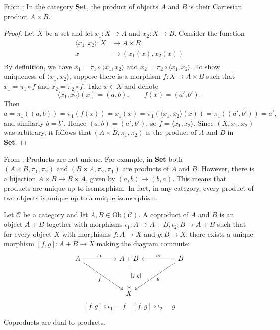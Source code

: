 \begin{proposition} From \cite{imada2019equivalence}: In the category \textbf{Set}, the product of objects $A$ and $B$ is their Cartesian product $A \times B$.
\end{proposition}

\begin{proof}
  Let $X$ be a set and let $x_1 : X \to A$ and $x_2 : X \to B$. Consider the function
  \[  
    \begin{aligned}
      \langle x_1, x_2 \rangle : X &\to A \times B \\
      x &\mapsto (x_1(x), x_2(x)) \\
    \end{aligned}
  \]
By definition, we have
\(
x_1 = \pi_1 \circ \langle x_1, x_2 \rangle \text{ and }
x_2 = \pi_2 \circ \langle x_1, x_2 \rangle.
\)
To show uniqueness of $\langle x_1, x_2 \rangle$, suppose there is a morphism $f : X \to A \times B$ such that
\(
x_1 = \pi_1 \circ f
\text{ and }
x_2 = \pi_2 \circ f.
\)
Take $x \in X$ and denote
\[
\langle x_1, x_2 \rangle(x) = (a,b), 
\qquad f(x) = (a',b').
\]
Then
\(
a = \pi_1((a,b)) 
   = \pi_1(f(x)) 
   = x_1(x) 
   = \pi_1(\langle x_1, x_2 \rangle(x)) 
   = \pi_1((a',b')) 
   = a',
\)
and similarly $b = b'$. Hence $(a,b) = (a',b')$, so $f = \langle x_1, x_2 \rangle$. Since $(X, x_1, x_2)$ was arbitrary, it follows that $(A \times B, \pi_1, \pi_2)$ is the product of $A$ and $B$ in \textbf{Set}.
\end{proof}
\begin{remark} From \cite{imada2019equivalence}: Products are not unique. For example, in \textbf{Set} both 
\(
(A \times B, \pi_1, \pi_2)
\text{ and }
(B \times A, \pi_2, \pi_1)
\)
are products of $A$ and $B$. However, there is a bijection $A \times B \to B \times A$, given by $(a,b) \mapsto (b,a)$.  
This means that products are unique up to isomorphism. In fact, in any category, every product of two objects is unique up to a unique isomorphism.
\end{remark}
\begin{definition} Let $\mathcal{C}$ be a category and let $A,B \in \mathrm{Ob}(\mathcal{C})$.
  A coproduct of $A$ and $B$ is an object $A + B$ together with morphisms
  \( \iota_1 : A \to A + B, \iota_2 : B \to A + B \) such that for every object
  $X$ with morphisms $f : A \to X$ and $g : B \to X$, there exists a unique
  morphism $[f,g] : A + B \to X$ making the diagram commute:
  \label{def:coproduct}
  \[
    \begin{tikzcd}[row sep=huge, column sep=huge]
      A \arrow[r, "\iota_1"] \arrow[dr, "f"'] & A + B \arrow[d, dashrightarrow, "{[f,g]}"] & B \arrow[l, "\iota_2"'] \arrow[dl, "g"] \\
      & X &
    \end{tikzcd}
  \]
  \[
    [f,g] \circ \iota_1 = f
    \quad
    [f,g] \circ \iota_2 = g
  \]
\end{definition}
\begin{remark}
  Coproducts are dual to products.
\end{remark}

